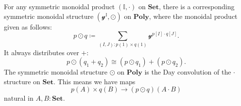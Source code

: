 \documentclass[11pt, one side, article]{memoir}
\theoremstyle{definition}
\theoremstyle{plain}
\newcommand{\Cat}[1]{\mathbf{#1}}%
\newcommand{\smset}{\Cat{Set}}
\newcommand{\yon}{\mathcal{y}}
\newcommand{\poly}{\Cat{Poly}}
\newcommand{\0}{\textsf{0}}
\newcommand{\1}{\tn{\textsf{1}}}
\begin{document}
For any symmetric monoidal product $(\mathbb{I},\cdot)$ on $\smset$, there is a corresponding symmetric monoidal structure $(\yon^\mathbb{I},\odot)$ on $\poly$, where the monoidal product given as follows:
\begin{equation}
p\odot q\coloneqq\sum_{(I,J): p(1)\times q(1)}\yon^{p[I]\cdot q[J]}.
\end{equation}
It always distributes over $+$:
\begin{equation}
p\odot(q_1+q_2)\cong (p\odot q_1)+(p\odot q_2).
\end{equation}
The symmetric monoidal structure $\odot$ on $\poly$ is the Day convolution of the $\cdot$ structure on $\smset$. This means we have maps
\begin{equation}\label{eqn.Day}
	p(A)\times q(B)\to (p\odot q)(A\cdot B)
\end{equation}
natural in $A,B:\smset$. 
\end{document}
